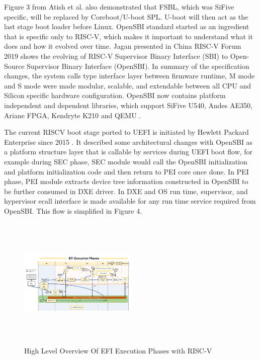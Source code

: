 \documentclass[a4paper,fleqn]{cas-dc}
\begin{document}
Figure 3 from Atish et al. also demonstrated that FSBL, which was SiFive specific, will be replaced by Coreboot/U-boot SPL. U-boot will then act as the last stage boot loader before Linux. OpenSBI standard started as an ingredient that is specific only to RISC-V, which makes it important to understand what it does and how it evolved over time. Jagan presented in China RISC-V Forum 2019 shows the evolving of RISC-V Supervisor Binary Interface (SBI) to Open-Source Supervisor Binary Interface (OpenSBI). In summary of the specification changes, the system calls type interface layer between firmware runtime, M mode and S mode were made modular, scalable, and extendable between all CPU and Silicon specific hardware configuration. OpenSBI now contains platform independent and dependent libraries, which support SiFive U540, Andes AE350, Ariane FPGA, Kendryte K210 and QEMU \cite{R51:1}.

The current RISCV boot stage ported to UEFI is initiated by Hewlett Packard Enterprise since 2015  \cite{R51:2}. It described some architectural changes with OpenSBI as a platform structure layer that is callable by services during UEFI boot flow, for example during SEC phase, SEC module would call the OpenSBI initialization and platform initialization code and then return to PEI core once done. In PEI phase, PEI module extracts device tree information constructed in OpenSBI to be further consumed in DXE driver. In DXE and OS run time, supervisor, and hypervisor ecall interface is made available for any run time service required from OpenSBI. This flow is simplified in Figure 4.

\begin{figure}[hbt!]
	\centering
	\includegraphics[width=0.5\textwidth,height=2.5in]{figs/HighLevelOverviewOfEfi.JPG}
	\caption{High Level Overview Of EFI Execution Phases with RISC-V \cite{R51:2}}
\end{figure}
\end{document}
